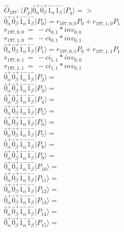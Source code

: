 \documentclass[14pt]{article}
\begin{document}
    $\hat{O}_{197}:  \langle{P_p}\vert \hat{0}_{\alpha}^{+}\hat{0}_{\beta}^{+}\hat{1}_{\alpha}^{-}\hat{1}_{\beta}^{-} \vert{P_q}\rangle => $ \\ 
    $ \hat{0}_{\alpha}^{+}\hat{0}_{\beta}^{+}\hat{1}_{\alpha}^{-}\hat{1}_{\beta}^{-} \vert{P_{0}}\rangle = {r}_{197,0,0}P_{0}+{r}_{197,1,0}P_{1} $ \\ 
    ${r}_{197,0,0}\ =\ -{ci}_{0,1}*{inv}_{0,0} $ \\ 
    ${r}_{197,1,0}\ =\ -{ci}_{0,1}*{inv}_{0,1} $ \\ 
    $ \hat{0}_{\alpha}^{+}\hat{0}_{\beta}^{+}\hat{1}_{\alpha}^{-}\hat{1}_{\beta}^{-} \vert{P_{1}}\rangle = {r}_{197,0,1}P_{0}+{r}_{197,1,1}P_{1} $ \\ 
    ${r}_{197,0,1}\ =\ -{ci}_{1,1}*{inv}_{0,0} $ \\ 
    ${r}_{197,1,1}\ =\ -{ci}_{1,1}*{inv}_{0,1} $ \\ 
    $ \hat{0}_{\alpha}^{+}\hat{0}_{\beta}^{+}\hat{1}_{\alpha}^{-}\hat{1}_{\beta}^{-} \vert{P_{2}}\rangle =  $ \\ 
    $ \hat{0}_{\alpha}^{+}\hat{0}_{\beta}^{+}\hat{1}_{\alpha}^{-}\hat{1}_{\beta}^{-} \vert{P_{3}}\rangle =  $ \\ 
    $ \hat{0}_{\alpha}^{+}\hat{0}_{\beta}^{+}\hat{1}_{\alpha}^{-}\hat{1}_{\beta}^{-} \vert{P_{4}}\rangle =  $ \\ 
    $ \hat{0}_{\alpha}^{+}\hat{0}_{\beta}^{+}\hat{1}_{\alpha}^{-}\hat{1}_{\beta}^{-} \vert{P_{5}}\rangle =  $ \\ 
    $ \hat{0}_{\alpha}^{+}\hat{0}_{\beta}^{+}\hat{1}_{\alpha}^{-}\hat{1}_{\beta}^{-} \vert{P_{6}}\rangle =  $ \\ 
    $ \hat{0}_{\alpha}^{+}\hat{0}_{\beta}^{+}\hat{1}_{\alpha}^{-}\hat{1}_{\beta}^{-} \vert{P_{7}}\rangle =  $ \\ 
    $ \hat{0}_{\alpha}^{+}\hat{0}_{\beta}^{+}\hat{1}_{\alpha}^{-}\hat{1}_{\beta}^{-} \vert{P_{8}}\rangle =  $ \\ 
    $ \hat{0}_{\alpha}^{+}\hat{0}_{\beta}^{+}\hat{1}_{\alpha}^{-}\hat{1}_{\beta}^{-} \vert{P_{9}}\rangle =  $ \\ 
    $ \hat{0}_{\alpha}^{+}\hat{0}_{\beta}^{+}\hat{1}_{\alpha}^{-}\hat{1}_{\beta}^{-} \vert{P_{10}}\rangle =  $ \\ 
    $ \hat{0}_{\alpha}^{+}\hat{0}_{\beta}^{+}\hat{1}_{\alpha}^{-}\hat{1}_{\beta}^{-} \vert{P_{11}}\rangle =  $ \\ 
    $ \hat{0}_{\alpha}^{+}\hat{0}_{\beta}^{+}\hat{1}_{\alpha}^{-}\hat{1}_{\beta}^{-} \vert{P_{12}}\rangle =  $ \\ 
    $ \hat{0}_{\alpha}^{+}\hat{0}_{\beta}^{+}\hat{1}_{\alpha}^{-}\hat{1}_{\beta}^{-} \vert{P_{13}}\rangle =  $ \\ 
    $ \hat{0}_{\alpha}^{+}\hat{0}_{\beta}^{+}\hat{1}_{\alpha}^{-}\hat{1}_{\beta}^{-} \vert{P_{14}}\rangle =  $ \\ 
    $ \hat{0}_{\alpha}^{+}\hat{0}_{\beta}^{+}\hat{1}_{\alpha}^{-}\hat{1}_{\beta}^{-} \vert{P_{15}}\rangle =  $ \\ 
    
\end{document}
